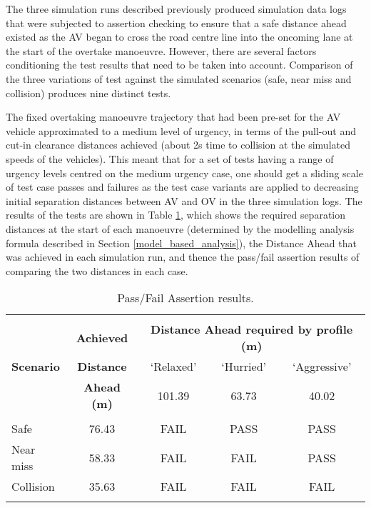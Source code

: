 The three simulation runs described previously produced simulation data logs that were subjected to assertion checking to ensure that a safe distance ahead existed as the AV began to cross the road centre line into the oncoming lane at the start of the overtake manoeuvre. However, there are several factors conditioning the test results that need to be taken into account. 
%
Comparison of the three variations of test against the simulated scenarios (safe, near miss and collision) produces nine distinct tests. 

The fixed overtaking manoeuvre trajectory that had been pre-set for the AV vehicle approximated to a medium level of urgency, in terms of the pull-out and cut-in clearance distances achieved (about 2s time to collision at the simulated speeds of the vehicles). This meant that for a set of tests having a range of urgency levels centred on the medium urgency case, one should get a sliding scale of test case passes and failures as the test case variants are applied to decreasing initial separation distances between AV and OV in the three simulation logs. The results of the tests are shown in Table \ref{Overtaking_Profiles}, which shows the required separation distances at the start of each manoeuvre (determined by the modelling analysis formula described in Section \ref{model_based_analysis}), the Distance Ahead that was achieved in each simulation run, and thence the pass/fail assertion results of comparing the two distances in each case.

\begin{table}[h]
\centering
\begin{tabular}{lcccc}
\hline
\\
\multirow{3}{*}{\textbf{Scenario}} & \textbf{Achieved} & \multicolumn{3}{c}{
\textbf{Distance Ahead required by profile (m)}}\\ %
& \textbf{Distance} & `Relaxed' & `Hurried' & `Aggressive' \\
& \textbf{Ahead (m)} & 101.39 & 63.73 & 40.02 \\
\\
%
Safe & 76.43 & FAIL & PASS & PASS\\
%
Near miss & 58.33 & FAIL & FAIL & PASS\\
%
Collision & 35.63 & FAIL & FAIL & FAIL\\
\\
\hline
\end{tabular}
\caption{Pass/Fail Assertion results.} \label{Overtaking_Profiles}
\end{table}

